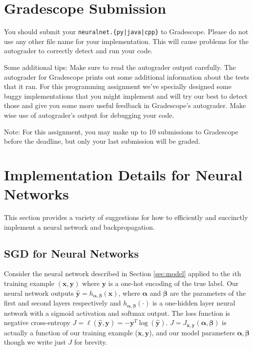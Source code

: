 \documentclass[11pt,addpoints,answers]{exam}
\newcommand{\xv}{\mathbf{x}}
\newcommand{\yv}{\mathbf{y}}
\newcommand{\alphav     }{\boldsymbol \alpha     }
\newcommand{\betav      }{\boldsymbol \beta      }
\begin{document}
\section{Gradescope Submission}
You should submit your \texttt{neuralnet.\{py|java|cpp\}} to Gradescope. Please do not use any other file name for your implementation. This will cause problems for the autograder to correctly detect and run your code.

Some additional tips: Make sure to read the autograder output carefully. The autograder for Gradescope prints out some additional 
information about the tests that it ran. For this programming assignment we've specially designed some buggy implementations that you might implement and will try our best to detect those and give you some more useful feedback in Gradescope's autograder. Make wise use of autograder's output for debugging your code.

Note: For this assignment, you may make up to 10 submissions to Gradescope before the deadline, but only your last submission will be graded.

\clearpage

\appendix
\section{Implementation Details for Neural Networks}
\label{sec:implementationdetails}

This section provides a variety of suggestions for how to efficiently and succinctly implement a neural network and backpropagation. 

\subsection{SGD for Neural Networks}
\label{sec:sgd}


Consider the neural network described in Section \ref{sec:model} applied to the $i$th training example $(\xv, \yv)$ where $\yv$ is a one-hot encoding of the true label. Our neural network outputs $\hat{\yv} = h_{\alphav, \betav}(\xv)$, where $\alphav$ and $\betav$ are the parameters of the first and second layers respectively and $h_{\alphav, \betav}(\cdot)$ is a one-hidden layer neural network with a sigmoid activation and softmax output. The loss function is negative cross-entropy $J = \ell(\hat{\yv}, \yv) = - \yv^T \log(\hat{\yv})$. $J = J_{\xv, \yv}(\alphav, \betav)$ is actually a function of our training example ($\xv, \yv$), and our model parameters $\alphav, \betav$ though we write just $J$ for brevity.
\end{document}
